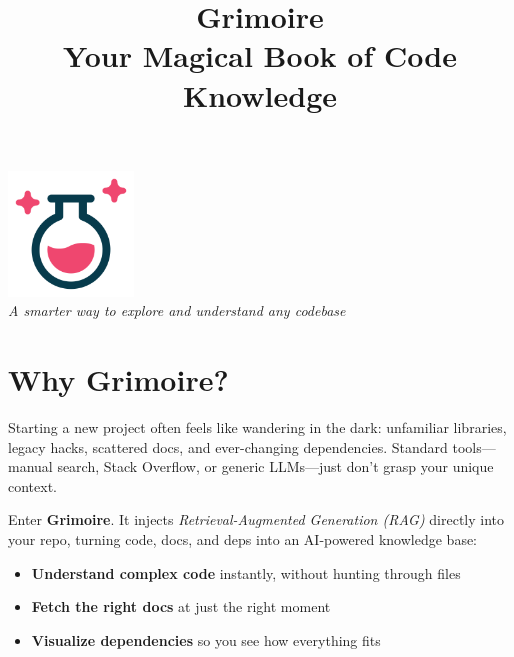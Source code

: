 \documentclass{article}
\title{%
  {\color{grimNavy}\Huge\bfseries Grimoire}\\[0.25em]
  {\color{grimPink}\Large Your Magical Book of Code Knowledge}%
}
\author{}
\date{}
\begin{document}
\maketitle

\begin{center}
  \includegraphics[width=0.25\textwidth]{logo.png}\\[1em]
  \itshape A smarter way to explore and understand any codebase
\end{center}

\section*{\color{grimPink}Why Grimoire?}
Starting a new project often feels like wandering in the dark: unfamiliar libraries, legacy hacks, scattered docs, and ever-changing dependencies. Standard tools—manual search, Stack Overflow, or generic LLMs—just don’t grasp your unique context.

Enter \textbf{Grimoire}. It injects \emph{Retrieval-Augmented Generation (RAG)} directly into your repo, turning code, docs, and deps into an AI-powered knowledge base:

\begin{itemize}[leftmargin=*]
  \item \textbf{Understand complex code} instantly, without hunting through files  
  \item \textbf{Fetch the right docs} at just the right moment  
  \item \textbf{Visualize dependencies} so you see how everything fits  
\end{itemize}
\end{document}
